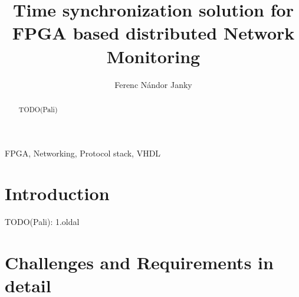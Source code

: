 \documentclass[article]{IEEEtran}
\begin{document}
\title{Time synchronization solution for FPGA based distributed Network Monitoring}

\author{Ferenc Nándor Janky} %



\maketitle

\begin{abstract}
    \boldmath
    TODO(Pali)
\end{abstract}

\begin{IEEEkeywords}
    FPGA, Networking, Protocol stack, VHDL
\end{IEEEkeywords}

\section{Introduction}\label{sec:Intro}

TODO(Pali): 1.oldal

\section{Challenges and Requirements in detail}\label{sec:Challanges}
\end{document}
